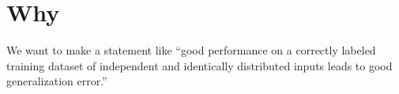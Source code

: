 
\section*{Why}

We want to make a statement like ``good performance on a correctly labeled training dataset of independent and identically distributed inputs leads to good generalization error.''

\blankpage